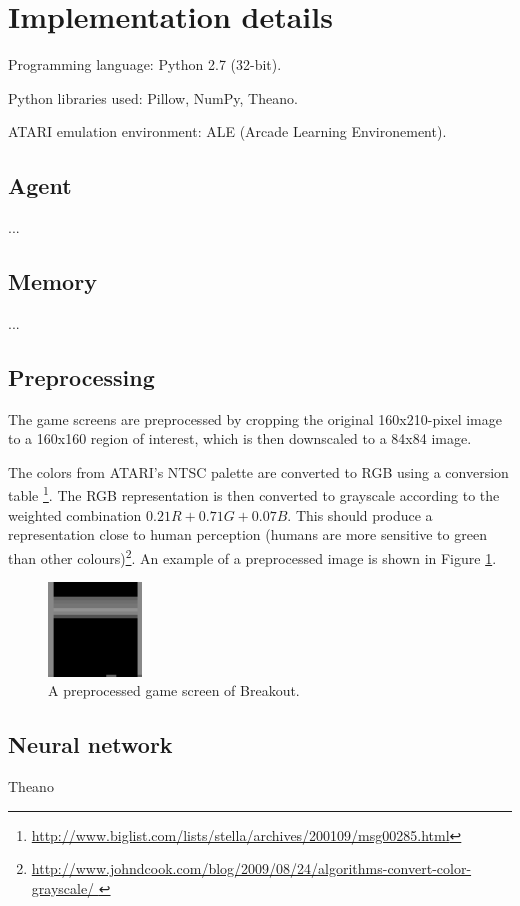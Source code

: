 \documentclass[a4paper,12pt]{article}
\begin{document}
%
%
\pagebreak
\section{Implementation details}
Programming language: Python 2.7 (32-bit).

Python libraries used: Pillow, NumPy, Theano.

ATARI emulation environment: ALE (Arcade Learning Environement).

\subsection{Agent}
...

\subsection{Memory}
...

\subsection{Preprocessing}
\label{subsection_preproc}
The game screens are preprocessed by cropping the original 160x210-pixel image to a 160x160 region of interest, which is then downscaled to a 84x84 image.

The colors from ATARI's NTSC palette are converted to RGB using a conversion table
\footnote{\url{http://www.biglist.com/lists/stella/archives/200109/msg00285.html}}. The RGB representation is then converted to grayscale according to the weighted combination $0.21R + 0.71G + 0.07B$. This should produce a representation close to human perception (humans are more sensitive to green than other colours)\footnote{\url{http://www.johndcook.com/blog/2009/08/24/algorithms-convert-color-grayscale/
}}. An example of a preprocessed image is shown in Figure \ref{fig:breakoutpreprocessed}.

\begin{figure}[h]
\centering
\includegraphics[width=2.5cm]{fig_preprocessedscreen}
\caption{A preprocessed game screen of Breakout.}
\label{fig:breakoutpreprocessed}
\end{figure}

\subsection{Neural network}
Theano
\end{document}
